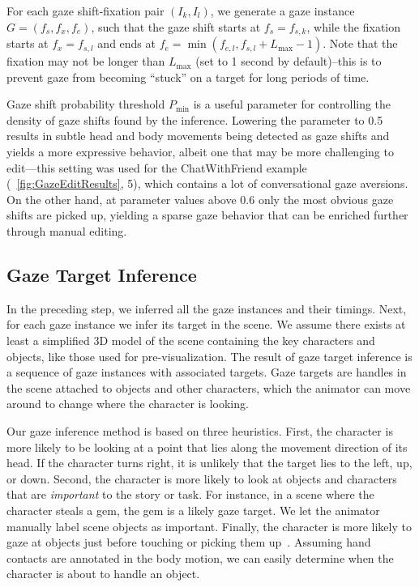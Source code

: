 For each gaze shift-fixation pair $(I_k, I_l)$, we generate a gaze instance $G = (f_s, f_x, f_e)$, such that the gaze shift starts at $f_s = f_{s,k}$, while the fixation starts at $f_x = f_{s,l}$ and ends at $f_e = \mathop{min}(f_{e,l}, f_{s,l} + L_\mathrm{max} - 1)$. Note that the fixation may not be longer than $L_\mathrm{max}$ (set to 1 second by default)--this is to prevent gaze from becoming ``stuck'' on a target for long periods of time.

Gaze shift probability threshold $P_\mathrm{min}$ is a useful parameter for controlling the density of gaze shifts found by the inference. Lowering the parameter to 0.5 results in subtle head and body movements being detected as gaze shifts and yields a more expressive behavior, albeit one that may be more challenging to edit---this setting was used for the ChatWithFriend example (~\ref{fig:GazeEditResults}, 5), which contains a lot of conversational gaze aversions. On the other hand, at parameter values above 0.6 only the most obvious gaze shifts are picked up, yielding a sparse gaze behavior that can be enriched further through manual editing.

\subsection{Gaze Target Inference}
\label{sec:GazeTargetInference}

In the preceding step, we inferred all the gaze instances and their timings. Next, for each gaze instance we infer its target in the scene. We assume there exists at least a simplified 3D model of the scene containing the key characters and objects, like those used for pre-visualization. The result of gaze target inference is a sequence of gaze instances with associated targets. Gaze targets are handles in the scene attached to objects and other characters, which the animator can move around to change where the character is looking.

Our gaze inference method is based on three heuristics. First, the character is more likely to be looking at a point that lies along the movement direction of its head. If the character turns right, it is unlikely that the target lies to the left, up, or down. Second, the character is more likely to look at objects and characters that are \emph{important} to the story or task. For instance, in a scene where the character steals a gem, the gem is a likely gaze target. We let the animator manually label scene objects as important. Finally, the character is more likely to gaze at objects just before touching or picking them up~\citep{johansson2001eyehead}. Assuming hand contacts are annotated in the body motion, we can easily determine when the character is about to handle an object.

